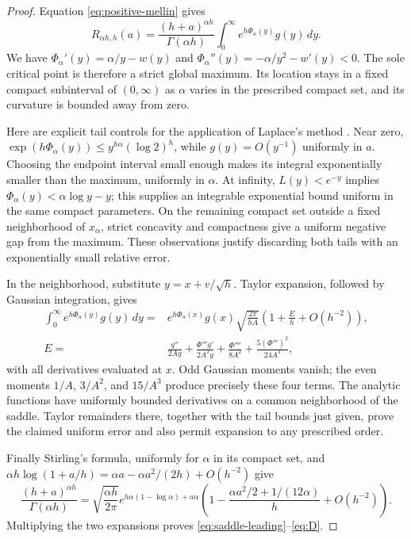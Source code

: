 \begin{proof}
Equation \eqref{eq:positive-mellin} gives
\[
 R_{\alpha h,h}(a)
 =\frac{(h+a)^{\alpha h}}{\Gamma(\alpha h)}
 \int_0^\infty e^{h\Phi_\alpha(y)}g(y)\,dy.
\]
We have
$\Phi_\alpha'(y)=\alpha/y-w(y)$ and
$\Phi_\alpha''(y)=-\alpha/y^2-w'(y)<0$.
The sole critical point is therefore a strict global maximum.
Its location stays in a fixed compact subinterval of $(0,\infty)$ as
$\alpha$ varies in the prescribed compact set, and its curvature is
bounded away from zero.

Here are explicit tail controls for the application of Laplace's method
\cite[\S2.3(iii)]{DLMFLaplace}
\cite[Section 2.3(iii)]{DLMFLaplace}. Near zero,
$\exp(h\Phi_\alpha(y))\leq y^{h\alpha}(\log2)^h$,
while $g(y)=O(y^{-1})$ uniformly in $a$. Choosing the endpoint interval
small enough makes its integral exponentially smaller than the maximum,
uniformly in $\alpha$. At infinity, $L(y)<e^{-y}$ implies
$\Phi_\alpha(y)<\alpha\log y-y$; this supplies an integrable
exponential bound uniform in the same compact parameters. On the
remaining compact set outside a fixed neighborhood of $x_\alpha$,
strict concavity and compactness give a uniform negative gap from the
maximum. These observations justify discarding both tails with an
exponentially small relative error.

In the neighborhood, substitute
$y=x+v/\sqrt h$. Taylor expansion, followed by Gaussian integration,
gives
\begin{align*}
 \int_0^\infty e^{h\Phi_\alpha(y)}g(y)\,dy
 ={}&e^{h\Phi_\alpha(x)}g(x)
 \sqrt{\frac{2\pi}{hA}}\left(1+\frac Eh+O(h^{-2})\right),\\
 E={}&\frac{g''}{2Ag}
 +\frac{\Phi'''g'}{2A^2g}
 +\frac{\Phi''''}{8A^2}
 +\frac{5(\Phi''')^2}{24A^3},
\end{align*}
with all derivatives evaluated at $x$. Odd Gaussian moments vanish;
the even moments $1/A$, $3/A^2$, and $15/A^3$ produce precisely these
four terms. The analytic functions have uniformly bounded derivatives
on a common neighborhood of the saddle. Taylor remainders there,
together with the tail bounds just given, prove the claimed uniform
error and also permit expansion to any prescribed order.

Finally Stirling's formula, uniformly for $\alpha$ in its compact set,
and $\alpha h\log(1+a/h)=\alpha a-\alpha a^2/(2h)+O(h^{-2})$
give
\[
 \frac{(h+a)^{\alpha h}}{\Gamma(\alpha h)}
 =\sqrt{\frac{\alpha h}{2\pi}}
 e^{h\alpha(1-\log\alpha)+a\alpha}
 \left(1-\frac{\alpha a^2/2+1/(12\alpha)}h+O(h^{-2})\right).
\]
Multiplying the two expansions proves
\eqref{eq:saddle-leading}--\eqref{eq:D}.
\end{proof}

